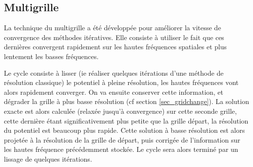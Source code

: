\subsection{Multigrille}

La technique du multigrille a été développée pour améliorer la vitesse de convergence des méthodes itératives.
Elle consiste à utiliser le fait que ces dernières convergent rapidement sur les hautes fréquences spatiales et plus lentement les basses fréquences.%

%
%

Le cycle consiste à lisser (ie réaliser quelques itérations d'une méthode de résolution classique) le potentiel à pleine résolution, les hautes fréquences vont alors rapidement converger.
On va ensuite conserver cette information, et dégrader la grille à plus basse résolution (cf section \ref{sec_gridchange}).
La solution exacte est alors calculée (relaxée jusqu'à convergence) sur cette seconde grille, cette dernière étant significativement plus petite que la grille départ, la résolution du potentiel est beaucoup plus rapide.
Cette solution à basse résolution est alors projetée à la résolution de la grille de départ, puis corrigée de l'information sur les hautes fréquence précédemment stockée.
Le cycle sera alors terminé par un lissage de quelques itérations.

